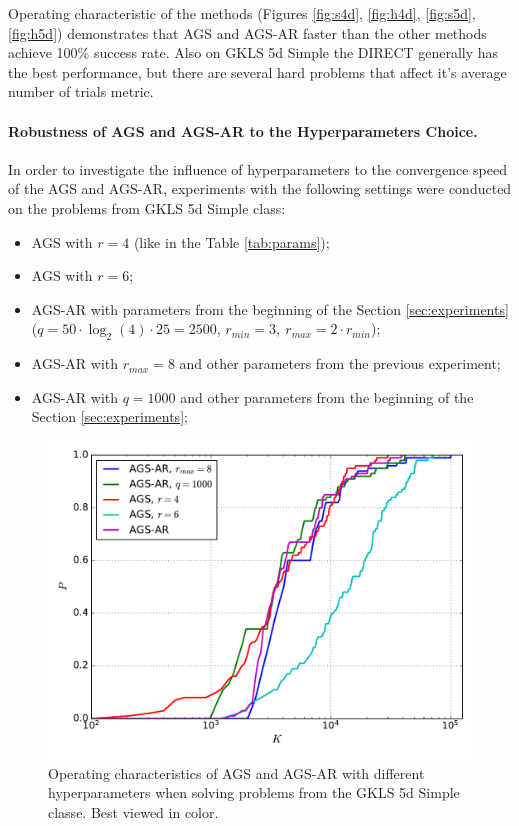\documentclass[runningheads]{llncs}
\begin{document}
Operating characteristic of the methods (Figures \ref{fig:s4d}, \ref{fig:h4d}, \ref{fig:s5d}, \ref{fig:h5d})
demonstrates that AGS and AGS-AR faster than the other methods achieve 100\% success rate. Also on GKLS 5d Simple the DIRECT
generally has the best performance, but there are several hard problems that affect it's average number of
trials metric.

\paragraph{Robustness of AGS and AGS-AR to the Hyperparameters Choice.}

In order to investigate the influence of hyperparameters to the convergence speed of the AGS and AGS-AR,
experiments with the following settings were conducted on the problems from GKLS 5d Simple class:
\begin{itemize}
  \item AGS with $r=4$ (like in the Table \ref{tab:params});
  \item AGS with $r=6$;
  \item AGS-AR with parameters from the beginning of the Section \ref{sec:experiments}
  ($q=50\cdot\log_2(4)\cdot 25 = 2500$, $r_{min}=3,\:r_{max}=2\cdot r_{min}$);
  \item AGS-AR with $r_{max}=8$ and other parameters from the previous experiment;
  \item AGS-AR with $q=1000$ and other parameters from the beginning of the Section \ref{sec:experiments};
\end{itemize}

\begin{figure}[ht]
  \centering
  \includegraphics[width=.6\textwidth]{images/ar_stab.pdf}
  \caption{Operating characteristics of AGS and AGS-AR with different hyperparameters
  when solving problems from the GKLS 5d Simple classe. Best viewed in color.}
  \label{fig:stability}
\end{figure}
\end{document}
